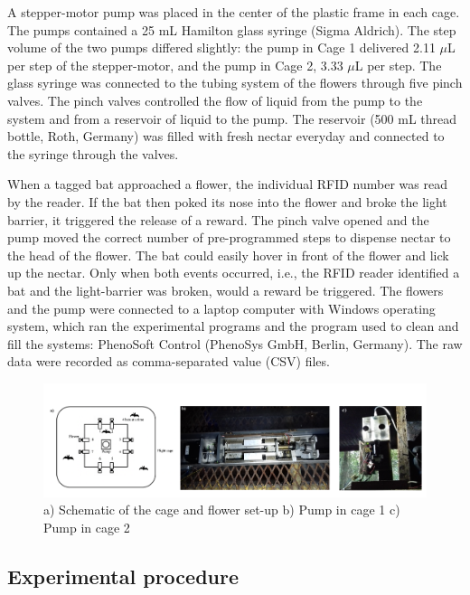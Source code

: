 \documentclass[
]{article}
\begin{document}
A stepper-motor pump was placed in the center of the plastic frame in each cage. The pumps contained a 25 mL Hamilton glass syringe (Sigma Aldrich). The step volume of the two pumps differed slightly: the pump in Cage 1 delivered 2.11 \(\mu\)L per step of the stepper-motor, and the pump in Cage 2, 3.33 \(\mu\)L per step. The glass syringe was connected to the tubing system of the flowers through five pinch valves. The pinch valves controlled the flow of liquid from the pump to the system and from a reservoir of liquid to the pump. The reservoir (500 mL thread bottle, Roth, Germany) was filled with fresh nectar everyday and connected to the syringe through the valves.

When a tagged bat approached a flower, the individual RFID number was read by the reader. If the bat then poked its nose into the flower and broke the light barrier, it triggered the release of a reward. The pinch valve opened and the pump moved the correct number of pre-programmed steps to dispense nectar to the head of the flower. The bat could easily hover in front of the flower and lick up the nectar. Only when both events occurred, i.e., the RFID reader identified a bat and the light-barrier was broken, would a reward be triggered. The flowers and the pump were connected to a laptop computer with Windows operating system, which ran the experimental programs and the program used to clean and fill the systems: PhenoSoft Control (PhenoSys GmbH, Berlin, Germany). The raw data were recorded as comma-separated value (CSV) files.



\begin{figure}[H]

{\centering \includegraphics[width=28.19in]{images/allthree} 

}

\caption{a) Schematic of the cage and flower set-up b) Pump in cage 1 c) Pump in cage 2}\label{fig:Pump-pictures}
\end{figure}

\hypertarget{experimental-procedure}{%
\subsection{Experimental procedure}\label{experimental-procedure}}
\end{document}
